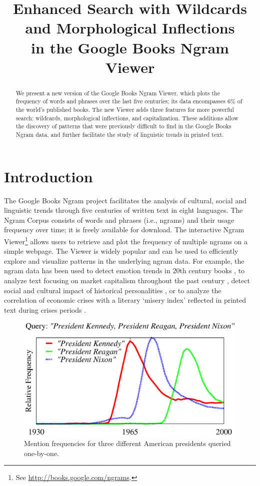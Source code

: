 \documentclass[11pt,a4paper]{article}
\title{Enhanced Search with Wildcards and Morphological Inflections\\in the Google Books Ngram Viewer}
\date{}
\begin{document}
\maketitle

\begin{abstract}

We present a new version of the Google Books Ngram Viewer, which plots
the frequency of words and phrases over the last five
centuries; its data encompasses 6\% of the world's published books.
The new Viewer adds three features for more powerful search: wildcards,
morphological inflections, and capitalization. These additions allow
the discovery of patterns that were previously difficult to find in the Google Books Ngram data,
and further facilitate the study of linguistic trends in printed text.

\end{abstract}

\section{Introduction}

The Google Books Ngram project facilitates the analysis of cultural, social and linguistic trends through five centuries of written text in eight languages. The Ngram Corpus \cite{culturomics,lin2012syntactic} consists of words and phrases (i.e., ngrams) and their usage frequency over time; it is freely available for download. The interactive Ngram Viewer\footnote{See \url{http://books.google.com/ngrams}.} allows users to retrieve and plot the frequency of multiple ngrams on a simple webpage. The Viewer is widely popular and can be used to efficiently explore and visualize patterns in the underlying ngram data. For example, the ngram data has been used to detect emotion trends in 20th century books \cite{acerbi.etal.2013}, to analyze text focusing on market capitalism throughout the past century \cite{Schulz2013}, detect social and cultural impact of historical personalities \cite{skiena.ward.2013}, or to analyze the correlation of economic crises with a literary `misery index' reflected in printed text during crises periods \cite{bentley.et.al.2014}.

\begin{figure}[t]
\includegraphics[width=\columnwidth]{graphs/kenreanixon}
\caption{\label{fig:manual}Mention frequencies for three different American presidents queried one-by-one.
\vspace{-1.5em}}
\end{figure}
\end{document}

